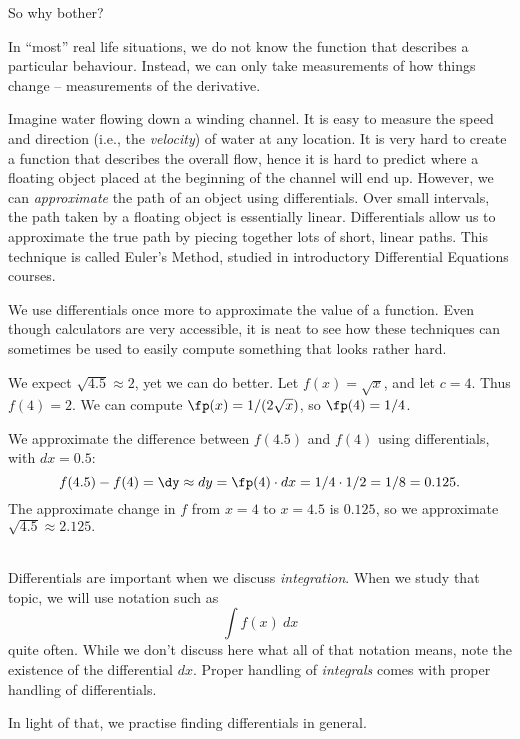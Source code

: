 So why bother?

In ``most'' real life situations, we do not know the function that describes a particular behaviour. Instead, we can only take measurements of how things change -- measurements of the derivative.

Imagine water flowing down a winding channel. It is easy to measure the speed and direction (i.e., the \textit{velocity}) of water at any location. It is very hard to create a function that describes the overall flow, hence it is hard to predict where a floating object placed at the beginning of the channel will end up. However, we can \textit{approximate} the path of an object using differentials. Over small intervals, the path taken by a floating object is essentially linear. Differentials allow us to approximate the true path by piecing together lots of short, linear paths. This technique is called Euler's Method, studied in introductory Differential Equations courses.

We use differentials once more to approximate the value of a function. Even though calculators are very accessible, it is neat to see how these techniques can sometimes be used to easily compute something that looks rather hard.\\


{We expect $\sqrt{4.5} \approx 2$, yet we can do better. Let $f(x) = \sqrt{x}$, and let $c=4$. Thus $f(4) = 2$. We can compute $\fp(x) = 1/(2\sqrt{x})$, so $\fp(4) = 1/4$. 

We approximate the difference between $f(4.5)$ and $f(4)$ using differentials, with $dx = 0.5$:
\[
f(4.5)-f(4) = \dy \approx dy = \fp(4)\cdot dx = 1/4 \cdot 1/2 = 1/8 = 0.125.
\]
The approximate change in $f$ from $x=4$ to $x=4.5$ is $0.125$, so we approximate $\sqrt{4.5} \approx 2.125.$
}\\

Differentials are important when we discuss \textit{integration}. When we study that topic, we will use notation such as 
\[
\int f(x)\ dx
\]
 quite often. While we don't discuss here what all of that notation means, note the existence of the differential $dx$. Proper handling of \textit{integrals} comes with proper handling of differentials. 

In light of that, we practise finding differentials in general.\\

